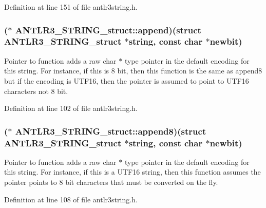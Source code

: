 Definition at line 151 of file antlr3string.\-h.

\hypertarget{struct_a_n_t_l_r3___s_t_r_i_n_g__struct_a4d1a7db3a22fe7f15969cf4fc4c6a16c}{
\subsubsection[{append}]{($\ast$ A\-N\-T\-L\-R3\-\_\-\-S\-T\-R\-I\-N\-G\-\_\-struct\-::append)(struct {\bf A\-N\-T\-L\-R3\-\_\-\-S\-T\-R\-I\-N\-G\-\_\-struct} $\ast$string, const char $\ast$newbit)}}\label{struct_a_n_t_l_r3___s_t_r_i_n_g__struct_a4d1a7db3a22fe7f15969cf4fc4c6a16c}
Pointer to function adds a raw char $\ast$ type pointer in the default encoding for this string. For instance, if this is 8 bit, then this function is the same as append8 but if the encoding is U\-T\-F16, then the pointer is assumed to point to U\-T\-F16 characters not 8 bit. 

Definition at line 102 of file antlr3string.\-h.

\hypertarget{struct_a_n_t_l_r3___s_t_r_i_n_g__struct_a6d95e67b4d97cceea4d58248eb625c92}{
\subsubsection[{append8}]{($\ast$ A\-N\-T\-L\-R3\-\_\-\-S\-T\-R\-I\-N\-G\-\_\-struct\-::append8)(struct {\bf A\-N\-T\-L\-R3\-\_\-\-S\-T\-R\-I\-N\-G\-\_\-struct} $\ast$string, const char $\ast$newbit)}}\label{struct_a_n_t_l_r3___s_t_r_i_n_g__struct_a6d95e67b4d97cceea4d58248eb625c92}
Pointer to function adds a raw char $\ast$ type pointer in the default encoding for this string. For instance, if this is a U\-T\-F16 string, then this function assumes the pointer points to 8 bit characters that must be converted on the fly. 

Definition at line 108 of file antlr3string.\-h.

